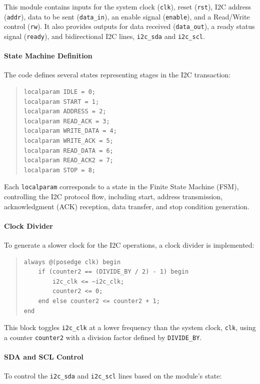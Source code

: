 \documentclass[a4paper,12pt]{report}
\begin{document}
This module contains inputs for the system clock (\texttt{clk}), reset (\texttt{rst}), I2C address (\texttt{addr}), data to be sent (\texttt{data\_in}), an enable signal (\texttt{enable}), and a Read/Write control (\texttt{rw}). It also provides outputs for data received (\texttt{data\_out}), a ready status signal (\texttt{ready}), and bidirectional I2C lines, \texttt{i2c\_sda} and \texttt{i2c\_scl}.

\paragraph{State Machine Definition}
The code defines several states representing stages in the I2C transaction:

\begin{quote}
\begin{verbatim}
localparam IDLE = 0;
localparam START = 1;
localparam ADDRESS = 2;
localparam READ_ACK = 3;
localparam WRITE_DATA = 4;
localparam WRITE_ACK = 5;
localparam READ_DATA = 6;
localparam READ_ACK2 = 7;
localparam STOP = 8;
\end{verbatim}
\end{quote}

Each \texttt{localparam} corresponds to a state in the Finite State Machine (FSM), controlling the I2C protocol flow, including start, address transmission, acknowledgment (ACK) reception, data transfer, and stop condition generation.

\paragraph{Clock Divider}
To generate a slower clock for the I2C operations, a clock divider is implemented:

\begin{quote}
\begin{verbatim}
always @(posedge clk) begin
    if (counter2 == (DIVIDE_BY / 2) - 1) begin
        i2c_clk <= ~i2c_clk;
        counter2 <= 0;
    end else counter2 <= counter2 + 1;
end
\end{verbatim}
\end{quote}

This block toggles \texttt{i2c\_clk} at a lower frequency than the system clock, \texttt{clk}, using a counter \texttt{counter2} with a division factor defined by \texttt{DIVIDE\_BY}.

\paragraph{SDA and SCL Control}
To control the \texttt{i2c\_sda} and \texttt{i2c\_scl} lines based on the module’s state:
\end{document}

